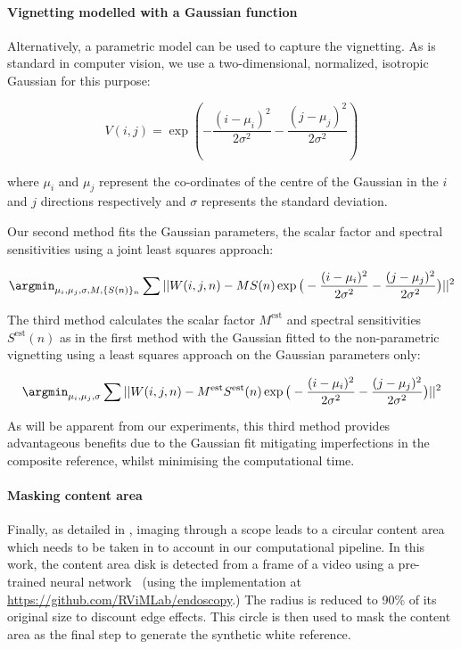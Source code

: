 \paragraph{Vignetting modelled with a Gaussian function}
Alternatively, a parametric model can be used to capture the vignetting.
As is standard in computer vision, we use a two-dimensional, normalized, isotropic Gaussian for this purpose:
\begin{linenomath*}
\begin{equation}
	V(i,j) = \exp\left(-\frac{(i-\mu_i)^2}{2\sigma^2} - \frac{(j-\mu_j)^2}{2\sigma^2} \right)
\label{eq:2DGauss}
\end{equation}
\end{linenomath*}
%
where $\mu_i$ and $\mu_j$ represent the co-ordinates of the centre of the Gaussian in the $i$ and $j$ directions respectively and $\sigma$ represents the standard deviation. 
%

Our second method fits the Gaussian parameters, the scalar factor and spectral sensitivities using a joint least squares approach:
%
\begin{linenomath*}
\begin{equation}
	\argmin_{\mu_i,\mu_j,\sigma, M, \{S(n)\}_{n}} \sum || W(i,j,n) - MS(n) \exp\big( -\frac{(i-\mu_i)^2}{2\sigma^2} - \frac{(j-\mu_j)^2}{2\sigma^2}\big) ||^2
\end{equation}
\end{linenomath*}

The third method calculates the scalar factor $M^{\textrm{est}}$ and spectral sensitivities $S^{\textrm{est}}(n)$ as in the first method with the Gaussian fitted to the non-parametric vignetting using a 
%
least squares approach on the Gaussian parameters only:
\begin{linenomath*}
\begin{equation}
	\argmin_{\mu_i,\mu_j,\sigma} \sum || W(i,j,n) - M^{\textrm{est}}S^{\textrm{est}}(n) \exp\big( -\frac{(i-\mu_i)^2}{2\sigma^2} - \frac{(j-\mu_j)^2}{2\sigma^2}\big) ||^2
\end{equation}
\end{linenomath*}
%
%
As will be apparent from our experiments, this third method provides advantageous benefits due to the Gaussian fit mitigating imperfections in the composite reference, whilst minimising the computational time.

%
%

\paragraph{Masking content area}
Finally, as detailed in \citet{Munzer2013,Huber2022}, imaging through a scope leads to a circular content area which needs to be taken in to account in our computational pipeline.
In this work, the content area disk
%
is detected from a frame of a video using a pre-trained neural network~\citep{Huber2022} (using the implementation at \url{https://github.com/RViMLab/endoscopy}.)
The radius is reduced to 90\% of its original size to discount edge effects. This circle is then used to mask the content area as the final step to generate the synthetic white reference.

